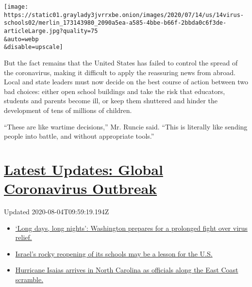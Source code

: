 \texttt{[image: https://static01.graylady3jvrrxbe.onion/images/2020/07/14/us/14virus-schools02/merlin\_173143980\_2090a5ea-a585-4bbe-b66f-2bbda0c6f3de-articleLarge.jpg?quality=75\\\&auto=webp\\\&disable=upscale]}

But the fact remains that the United States has failed to control the
spread of the coronavirus, making it difficult to apply the reassuring
news from abroad. Local and state leaders must now decide on the best
course of action between two bad choices: either open school buildings
and take the risk that educators, students and parents become ill, or
keep them shuttered and hinder the development of tens of millions of
children.

``These are like wartime decisions,'' Mr. Runcie said. ``This is
literally like sending people into battle, and without appropriate
tools.''

\hypertarget{latest-updates-global-coronavirus-outbreak}{%
\section{\texorpdfstring{\href{https://www.nytimes3xbfgragh.onion/2020/08/04/world/coronavirus-covid-19.html?action=click\&pgtype=Article\&state=default\&region=MAIN_CONTENT_1\&context=storylines_live_updates}{Latest
Updates: Global Coronavirus
Outbreak}}{Latest Updates: Global Coronavirus Outbreak}}\label{latest-updates-global-coronavirus-outbreak}}

Updated 2020-08-04T09:59:19.194Z

\begin{itemize}
\tightlist
\item
  \href{https://www.nytimes3xbfgragh.onion/2020/08/04/world/coronavirus-covid-19.html?action=click\&pgtype=Article\&state=default\&region=MAIN_CONTENT_1\&context=storylines_live_updates\#link-6b644638}{`Long
  days, long nights': Washington prepares for a prolonged fight over
  virus relief.}
\item
  \href{https://www.nytimes3xbfgragh.onion/2020/08/04/world/coronavirus-covid-19.html?action=click\&pgtype=Article\&state=default\&region=MAIN_CONTENT_1\&context=storylines_live_updates\#link-7af9fca0}{Israel's
  rocky reopening of its schools may be a lesson for the U.S.}
\item
  \href{https://www.nytimes3xbfgragh.onion/2020/08/04/world/coronavirus-covid-19.html?action=click\&pgtype=Article\&state=default\&region=MAIN_CONTENT_1\&context=storylines_live_updates\#link-33bf9168}{Hurricane
  Isaias arrives in North Carolina as officials along the East Coast
  scramble.}
\end{itemize}

